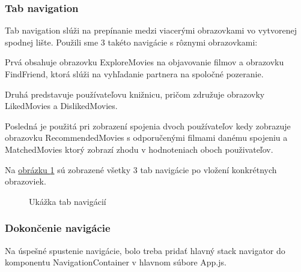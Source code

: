 \subsubsection{Tab navigation}
Tab navigation slúži na prepínanie medzi viacerými obrazovkami vo vytvorenej spodnej lište. Použili sme 3 takéto navigácie s rôznymi obrazovkami: 
\begin{itemize}
{\item Prvá obsahuje obrazovku ExploreMovies na objavovanie filmov a obrazovku FindFriend, ktorá slúži na vyhľadanie partnera na spoločné pozeranie. } 
{\item Druhá predstavuje používateľovu knižnicu, pričom združuje obrazovky LikedMovies a DislikedMovies.} 
{\item Posledná je použitá pri zobrazení spojenia dvoch používateľov kedy zobrazuje obrazovku RecommendedMovies s odporučenými filmami danému spojeniu a MatchedMovies ktorý zobrazí zhodu v hodnoteniach oboch použivateľov.} 
\end{itemize}

Na \hyperref[tabnav]{obrázku \ref{tabnav}} sú zobrazené všetky 3 tab navigácie po vložení konkrétnych obrazoviek.

\begin{figure}[hbt!]
  \centering   
  \def\stackalignment{c}
           \scriptsize
	\caption{Ukážka tab navigácií}  
  \label{tabnav}
\end{figure}

\subsubsection{Dokončenie navigácie}
Na úspešné spustenie navigácie, bolo treba pridať hlavný stack navigator do komponentu NavigationContainer v hlavnom súbore App.js. 

